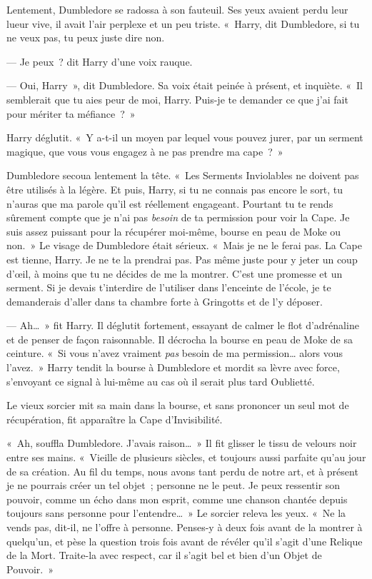 Lentement, Dumbledore se radossa à son fauteuil.
Ses yeux avaient perdu leur lueur vive, il avait l'air perplexe et un peu triste.
«~Harry, dit Dumbledore, si tu ne veux pas, tu peux juste dire non.

--- Je peux~? dit Harry d'une voix rauque.

--- Oui, Harry~», dit Dumbledore.
Sa voix était peinée à présent, et inquiète.
«~Il semblerait que tu aies peur de moi, Harry.
Puis-je te demander ce que j'ai fait pour mériter ta méfiance~?~»

Harry déglutit.
«~Y a-t-il un moyen par lequel vous pouvez jurer, par un serment magique, que vous vous engagez à ne pas prendre ma cape~?~»

Dumbledore secoua lentement la tête.
«~Les Serments Inviolables ne doivent pas être utilisés à la légère.
Et puis, Harry, si tu ne connais pas encore le sort, tu n'auras que ma parole qu'il est réellement engageant.
Pourtant tu te rends sûrement compte que je n'ai pas \emph{besoin} de ta permission pour voir la Cape.
Je suis assez puissant pour la récupérer moi-même, bourse en peau de Moke ou non.~»
Le visage de Dumbledore était sérieux.
«~Mais je ne le ferai pas.
La Cape est tienne, Harry.
Je ne te la prendrai pas.
Pas même juste pour y jeter un coup d'œil, à moins que tu ne décides de me la montrer.
C'est une promesse et un serment.
Si je devais t'interdire de l'utiliser dans l'enceinte de l'école, je te demanderais d'aller dans ta chambre forte à Gringotts et de l'y déposer.

--- Ah…~» fit Harry.
Il déglutit fortement, essayant de calmer le flot d'adrénaline et de penser de façon raisonnable.
Il décrocha la bourse en peau de Moke de sa ceinture.
«~Si vous n'avez vraiment \emph{pas} besoin de ma permission… alors vous l'avez.~»
Harry tendit la bourse à Dumbledore et mordit sa lèvre avec force, s'envoyant ce signal à lui-même au cas où il serait plus tard Oublietté.

Le vieux sorcier mit sa main dans la bourse, et sans prononcer un seul mot de récupération, fit apparaître la Cape d'Invisibilité.

«~Ah, souffla Dumbledore.
J'avais raison…~»
Il fit glisser le tissu de velours noir entre ses mains.
«~Vieille de plusieurs siècles, et toujours aussi parfaite qu'au jour de sa création.
Au fil du temps, nous avons tant perdu de notre art, et à présent je ne pourrais créer un tel objet~; personne ne le peut.
Je peux ressentir son pouvoir, comme un écho dans mon esprit, comme une chanson chantée depuis toujours sans personne pour l'entendre…~»
Le sorcier releva les yeux.
«~Ne la vends pas, dit-il, ne l'offre à personne.
Penses-y à deux fois avant de la montrer à quelqu'un, et pèse la question trois fois avant de révéler qu'il s'agit d'une Relique de la Mort.
Traite-la avec respect, car il s'agit bel et bien d'un Objet de Pouvoir.~»

